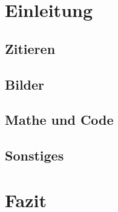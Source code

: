 \section{Einleitung} \label{sec:einleitung}

    \subsection{Zitieren}
    
    \subsection{Bilder}
    
    \subsection{Mathe und Code} \label{sec:mathe}
    
    \subsection{Sonstiges} \label{sec:sonstiges}
    
\newpage
\section{Fazit}
